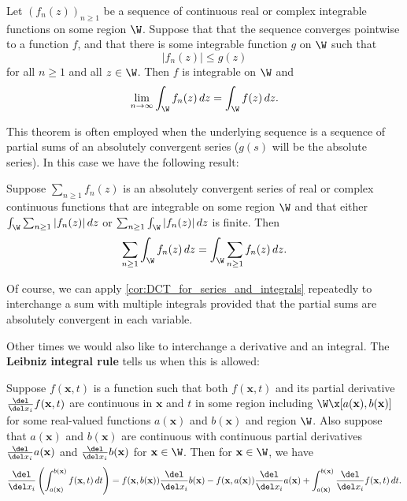     \begin{theorem}
      Let $(f_{n}(z))_{n \ge 1}$ be a sequence of continuous real or complex integrable functions on some region $\W$. Suppose that that the sequence converges pointwise to a function $f$, and that there is some integrable function $g$ on $\W$ such that
      \[
        |f_{n}(z)| \le g(z)
      \]
      for all $n \ge 1$ and all $z \in \W$. Then $f$ is integrable on $\W$ and
      \[
        \lim_{n \to \infty}\int_{\W}f_{n}(z)\,dz = \int_{\W}f(z)\,dz.
      \]
    \end{theorem}

    This theorem is often employed when the underlying sequence is a sequence of partial sums of an absolutely convergent series ($g(s)$ will be the absolute series). In this case we have the following result:

    \begin{corollary}\label{cor:DCT_for_series_and_integrals}
      Suppose $\sum_{n \ge 1}f_{n}(z)$ is an absolutely convergent series of real or complex continuous functions that are integrable on some region $\W$ and that either $\int_{\W}\sum_{n \ge 1}|f_{n}(z)|\,dz$ or $\sum_{n \ge 1}\int_{\W}|f_{n}(z)|\,dz$ is finite. Then
      \[
        \sum_{n \ge 1}\int_{\W}f_{n}(z)\,dz = \int_{\W}\sum_{n \ge 1}f_{n}(z)\,dz.
      \]
    \end{corollary}

    Of course, we can apply \cref{cor:DCT_for_series_and_integrals} repeatedly to interchange a sum with multiple integrals provided that the partial sums are absolutely convergent in each variable.

    Other times we would also like to interchange a derivative and an integral. The \textbf{Leibniz integral rule} tells us when this is allowed:

    \begin{theorem}
      Suppose $f(\mathbf{x},t)$ is a function such that both $f(\mathbf{x},t)$ and its partial derivative $\frac{\del}{\del x_{i}}f(\mathbf{x},t)$ are continuous in $\mathbf{x}$ and $t$ in some region including $\W \x [a(\mathbf{x}),b(\mathbf{x})]$ for some real-valued functions $a(\mathbf{x})$ and $b(\mathbf{x})$ and region $\W$. Also suppose that $a(\mathbf{x})$ and $b(\mathbf{x})$ are continuous with continuous partial derivatives $\frac{\del}{\del x_{i}}a(\mathbf{x})$ and $\frac{\del}{\del x_{i}}b(\mathbf{x})$ for $\mathbf{x} \in \W$. Then for $\mathbf{x} \in \W$, we have
      \[
        \frac{\del}{\del x_{i}}\left(\int_{a(\mathbf{x})}^{b(\mathbf{x})}f(\mathbf{x},t)\,dt\right) = f(\mathbf{x},b(\mathbf{x}))\frac{\del}{\del x_{i}}b(\mathbf{x})-f(\mathbf{x},a(\mathbf{x}))\frac{\del}{\del x_{i}}a(\mathbf{x})+\int_{a(\mathbf{x})}^{b(\mathbf{x})}\frac{\del}{\del x_{i}}f(\mathbf{x},t)\,dt.
      \]
    \end{theorem}
    
